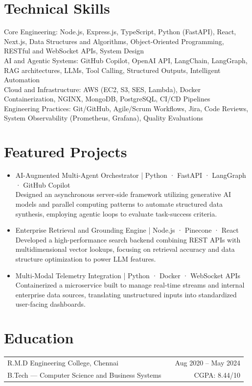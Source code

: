 \documentclass[a4paper,10pt]{article}
\begin{document}
\section{Technical Skills}
\noindent
Core Engineering: Node.js, Express.js, TypeScript, Python (FastAPI), React, Next.js, Data Structures and Algorithms, Object-Oriented Programming, RESTful and WebSocket APIs, System Design \\
AI and Agentic Systems: GitHub Copilot, OpenAI API, LangChain, LangGraph, RAG architectures, LLMs, Tool Calling, Structured Outputs, Intelligent Automation \\
Cloud and Infrastructure: AWS (EC2, S3, SES, Lambda), Docker Containerization, NGINX, MongoDB, PostgreSQL, CI/CD Pipelines \\
Engineering Practices: Git/GitHub, Agile/Scrum Workflows, Jira, Code Reviews, System Observability (Prometheus, Grafana), Quality Evaluations

\section{Featured Projects}
\begin{itemize}[nosep, leftmargin=2em]

\item AI-Augmented Multi-Agent Orchestrator | Python · FastAPI · LangGraph · GitHub Copilot \\
Designed an asynchronous server-side framework utilizing generative AI models and parallel computing patterns to automate structured data synthesis, employing agentic loops to evaluate task-success criteria.

\item Enterprise Retrieval and Grounding Engine | Node.js · Pinecone · React \\
Developed a high-performance search backend combining REST APIs with multidimensional vector lookups, focusing on retrieval accuracy and data structure optimization to power LLM features.

\item Multi-Modal Telemetry Integration | Python · Docker · WebSocket APIs \\
Containerized a microservice built to manage real-time streams and internal enterprise data sources, translating unstructured inputs into standardized user-facing dashboards.

\end{itemize}

\section{Education}
\begin{tabularx}{\linewidth}{ @{}l X r@{} }
R.M.D Engineering College, Chennai & & \hfill Aug 2020 -- May 2024 \\
B.Tech — Computer Science and Business Systems & & \hfill CGPA: 8.44/10
\end{tabularx}
\end{document}
